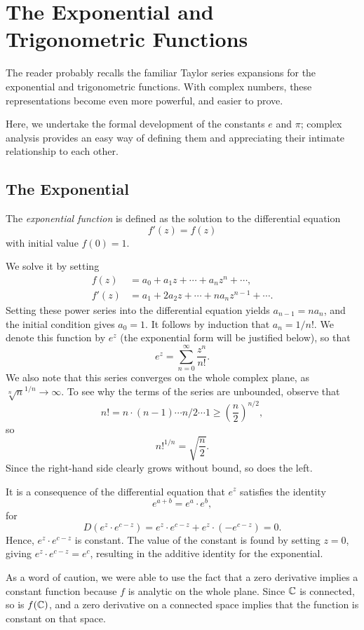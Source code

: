 \chapter{The Exponential and Trigonometric Functions}
\label{chap:exp-trig}
The reader probably recalls the familiar Taylor series expansions for the exponential and trigonometric functions. With complex numbers, these representations become even more powerful, and easier to prove.

Here, we undertake the formal development of the constants $e$ and $\pi$; complex analysis provides an easy way of defining them and appreciating their intimate relationship to each other.

\section{The Exponential}
\begin{definition}
	The \emph{exponential function} is defined as the solution to the differential equation $$f'(z)=f(z)$$ with initial value $f(0)=1$. 
\end{definition}
	
We solve it by setting
\begin{align*}
	f(z) &=a_0+a_1z+\cdots+a_nz^n+\cdots, \\
	f'(z) &=a_1+2a_2z+\cdots+na_nz^{n-1}+\cdots.
\end{align*}
Setting these power series into the differential equation yields $a_{n-1}=na_n$, and the initial condition gives $a_0=1$. It follows by induction that $a_n=1/n!$. We denote this function by $e^z$ (the exponential form will be justified below), so that $$e^z=\sum_{n=0}^{\infty}\dfrac{z^n}{n!}.$$ We also note that this series converges on the whole complex plane, as $\sqrt[n]{n}^{1/n} \rightarrow \infty$. To see why the terms of the series are unbounded, observe that $$n!=n \cdot (n-1) \cdots n/2 \cdots 1 \ge \left(\dfrac{n}{2}\right)^{n/2},$$ so $$n!^{1/n}=\sqrt{\dfrac{n}{2}}.$$ Since the right-hand side clearly grows without bound, so does the left.

It is a consequence of the differential equation that $e^z$ satisfies the identity $$e^{a+b}=e^a \cdot e^b,$$ for $$D(e^z \cdot e^{c-z})=e^z \cdot e^{c-z}+e^z \cdot (-e^{c-z})=0.$$ Hence, $e^z \cdot e^{c-z}$ is constant. The value of the constant is found by setting $z=0$, giving $e^z \cdot e^{c-z}=e^c$, resulting in the additive identity for the exponential.

As a word of caution, we were able to use the fact that a zero derivative implies a constant function because $f$ is analytic on the whole plane. Since $\mathbb C$ is connected, so is $f(\mathbb C)$, and a zero derivative on a connected space implies that the function is constant on that space.

